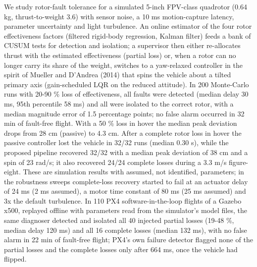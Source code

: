 We study rotor-fault tolerance for a simulated 5-inch FPV-class quadrotor (0.64 kg, thrust-to-weight 3.6) with sensor noise, a 10 ms motion-capture latency, parameter uncertainty and light turbulence. An online estimator of the four rotor effectiveness factors (filtered rigid-body regression, Kalman filter) feeds a bank of CUSUM tests for detection and isolation; a supervisor then either re-allocates thrust with the estimated effectiveness (partial loss) or, when a rotor can no longer carry its share of the weight, switches to a yaw-relaxed controller in the spirit of Mueller and D'Andrea (2014) that spins the vehicle about a tilted primary axis (gain-scheduled LQR on the reduced attitude). In 200 Monte-Carlo runs with 20-90 \% loss of effectiveness, all faults were detected (median delay 30 ms, 95th percentile 58 ms) and all were isolated to the correct rotor, with a median magnitude error of 1.5 percentage points; no false alarm occurred in 32 min of fault-free flight. With a 50 \% loss in hover the median peak deviation drops from 28 cm (passive) to 4.3 cm. After a complete rotor loss in hover the passive controller lost the vehicle in 32/32 runs (median 0.30 s), while the proposed pipeline recovered 32/32 with a median peak deviation of 38 cm and a spin of 23 rad/s; it also recovered 24/24 complete losses during a 3.3 m/s figure-eight. These are simulation results with assumed, not identified, parameters; in the robustness sweeps complete-loss recovery started to fail at an actuator delay of 24 ms (2 ms assumed), a motor time constant of 80 ms (25 ms assumed) and 3x the default turbulence. In 110 PX4 software-in-the-loop flights of a Gazebo x500, replayed offline with parameters read from the simulator's model files, the same diagnoser detected and isolated all 40 injected partial losses (19-48 \%, median delay 120 ms) and all 16 complete losses (median 132 ms), with no false alarm in 22 min of fault-free flight; PX4's own failure detector flagged none of the partial losses and the complete losses only after 664 ms, once the vehicle had flipped.
